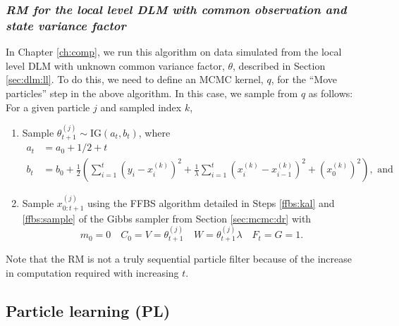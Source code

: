 \subsubsection{\emph{RM for the local level DLM with common observation and state variance factor} \label{sec:rm:ll}}

In Chapter \ref{ch:comp}, we run this algorithm on data simulated from the local level DLM with unknown common variance factor, $\theta$, described in Section \ref{sec:dlm:ll}. To do this, we need to define an MCMC kernel, $q$, for the ``Move particles'' step in the above algorithm. In this case, we sample from $q$ as follows: For a given particle $j$ and sampled index $k$,
\begin{enumerate}
\item \label{step:move:ll} Sample $\theta^{(j)}_{t+1} \sim \mbox{IG}(a_t, b_t)$, where
\begin{align*}
a_t &= a_0 + 1/2 + t \\
b_t &= b_0 + \frac{1}{2}\left(\sum_{i=1}^t \left(y_i - x_i^{(k)}\right)^2 + \frac{1}{\lambda}\sum_{i=1}^t \left(x_i^{(k)} - x_{i-1}^{(k)}\right)^2 + \left(x^{(k)}_0\right)^2\right),\mbox{ and}
\end{align*}
\item Sample $x_{0:t+1}^{(j)}$ using the FFBS algorithm detailed in Steps \ref{ffbs:kal} and \ref{ffbs:sample} of the Gibbs sampler from Section \ref{sec:mcmc:dr} with
\[m_0 = 0 \quad C_0 = V = \theta^{(j)}_{t+1} \quad W = \theta_{t+1}^{(j)}\lambda \quad F_t = G = 1.\]
\end{enumerate}
Note that the RM is not a truly sequential particle filter because of the increase in computation required with increasing $t$.

\subsection{Particle learning (PL) \label{sec:pl}}

